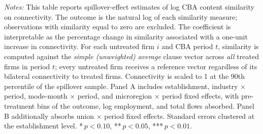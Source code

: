 \begin{table}[H]
\begin{minipage}{\linewidth}
\smallskip
\scriptsize\textit{Notes:} This table reports spillover-effect estimates of log CBA content similarity on connectivity. The outcome is the natural log of each similarity measure; observations with similarity equal to zero are excluded. The coefficient is interpretable as the percentage change in similarity associated with a one-unit increase in connectivity. For each untreated firm $i$ and CBA period $t$, similarity is computed against the \emph{simple (unweighted) average} clause vector across \emph{all} treated firms in period $t$; every untreated firm receives a reference vector regardless of its bilateral connectivity to treated firms. Connectivity is scaled to 1 at the 90th percentile of the spillover sample. Panel A includes establishment, industry $\times$ period, mode-month $\times$ period, and microregion $\times$ period fixed effects, with pre-treatment bins of the outcome, log employment, and total flows absorbed. Panel B additionally absorbs union $\times$ period fixed effects. Standard errors clustered at the establishment level. *\,$p<0.10$, **\,$p<0.05$, ***\,$p<0.01$.
\end{minipage}
\end{table}
